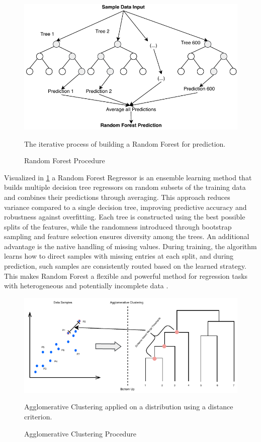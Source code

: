 \label{sec:background_ml_rfr}
\begin{figure}[H]
    \centering
    \includegraphics[scale=0.7]{fig/02/02-rf.pdf}
    \small
    \caption{Random Forest Procedure}
    \label{fig:02-rf}
    \tiny
    The iterative process of building a Random Forest for prediction.
\end{figure}

Visualized in \ref{fig:02-rf} a Random Forest Regressor is an ensemble learning method that builds multiple decision tree regressors on random subsets of the training data and combines their predictions through averaging. This approach reduces variance compared to a single decision tree, improving predictive accuracy and robustness against overfitting. Each tree is constructed using the best possible splits of the features, while the randomness introduced through bootstrap sampling and feature selection ensures diversity among the trees. An additional advantage is the native handling of missing values. During training, the algorithm learns how to direct samples with missing entries at each split, and during prediction, such samples are consistently routed based on the learned strategy. This makes Random Forest a flexible and powerful method for regression tasks with heterogeneous and potentially incomplete data \cite{Breiman2001RandomF} \cite{scikit_rfr_2025}.


\label{sec:background_ml_ac}

\begin{figure}[H]
    \centering
    \includegraphics{fig/02/02-clustering.pdf}
    \small
    \caption{Agglomerative Clustering Procedure}
    \label{fig:02-clustering}
    \tiny
    Agglomerative Clustering applied on a distribution using a distance criterion.
\end{figure}

